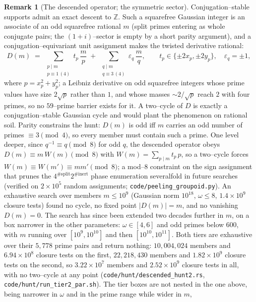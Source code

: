 \documentclass[11pt]{article}
\theoremstyle{definition}
\newtheorem{remark}[theorem]{Remark}
\begin{document}
\begin{remark}[The descended operator; the symmetric sector]\label{rem:descent}
Conjugation--stable supports admit an exact descent to $\mathbb{Z}$. Such a squarefree Gaussian integer
is an associate of an odd squarefree rational $m$ (split primes entering as whole conjugate pairs; the
$(1+i)$--sector is empty by a short parity argument), and a conjugation--equivariant unit assignment
makes the twisted derivative rational:
\[ D(m)\;=\;\sum_{\substack{p\mid m\\ p\equiv1\,(4)}} t_p\,\frac mp\;+\;\sum_{\substack{q\mid m\\
q\equiv3\,(4)}}\varepsilon_q\,\frac mq, \qquad t_p\in\{\pm2x_p,\pm2y_p\},\quad \varepsilon_q=\pm1, \]
where $p=x_p^2+y_p^2$; a Leibniz derivative on odd squarefree integers whose prime values have size
$2\sqrt p$ rather than $1$, and whose masses ${\sim}2/\sqrt p$ reach $2$ with four primes, so no
$59$--prime barrier exists for it. A two--cycle of $D$ is exactly a conjugation--stable Gaussian cycle
and would plant the phenomenon on rational soil. Parity constrains the hunt: $D(m)$ is odd iff $m$
carries an odd number of primes $\equiv3\pmod4$, so every member must contain such a prime.
One level deeper, since $q^{-1}\equiv q\pmod 8$ for odd $q$, the descended operator obeys
$D(m)\equiv m\,W(m)\pmod 8$ with $W(m)=\sum_{p\mid m}t_p\,p$, so a two--cycle forces
$W(m)\equiv W(m')\equiv mm'\pmod 8$; a mod--$8$ constraint on the sign assignment that prunes
the $4^{\#\mathrm{split}}2^{\#\mathrm{inert}}$ phase enumeration severalfold in future searches
(verified on $2\times10^5$ random assignments; \texttt{code/peeling\_groupoid.py}). An
exhaustive search over members $m\le10^9$ (Gaussian norm $10^{18}$, $\omega\le8$, $1.4\times10^9$
closure tests) found no cycle, no fixed point $|D(m)|=m$, and no vanishing $D(m)=0$. The search
has since been extended two decades further in $m$, on a box narrower in the other parameters:
$\omega\in[4,6]$ and odd primes below $600$, with $m$ running over $[10^9,10^{10}]$ and then
$[10^{10},10^{11}]$. Both tiers are exhaustive over their $5{,}778$ prime pairs and return nothing:
$10{,}004{,}024$ members and $6.94\times10^8$ closure tests on the first, $22{,}218{,}430$ members
and $1.82\times10^9$ closure tests on the second, so $3.22\times10^7$ members and
$2.52\times10^9$ closure tests in all, with no two--cycle at any point
\textup{(\texttt{code/hunt/descended\_hunt2.rs}, \texttt{code/hunt/run\_tier2\_par.sh})}. The tier boxes are
not nested in the one above, being narrower in $\omega$ and in the prime range while wider in $m$,

\end{remark}
\end{document}
